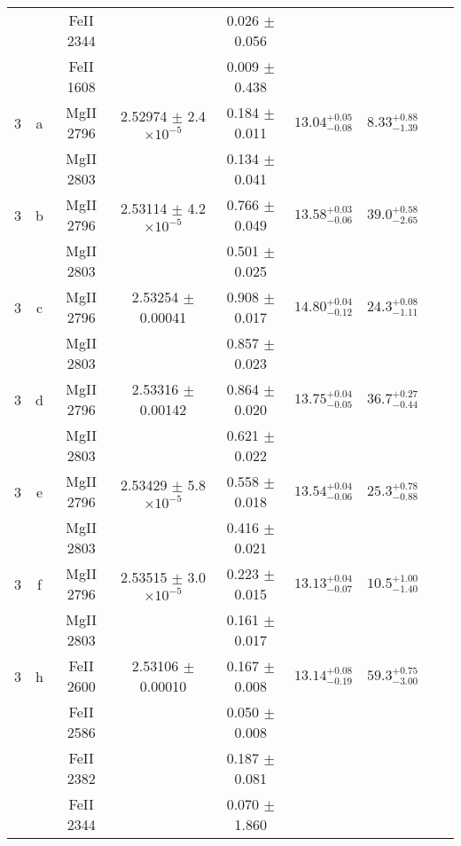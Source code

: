 \documentclass[12pt]{article}
\begin{document}
\begin{footnotesize}
\begin{longtable}{ c c c c c c c c c}
  &   & FeII     2344  &  &  0.026 $\pm$ 0.056   &   &     & 	 & \\ 
  &   & FeII     1608  &  &  0.009 $\pm$ 0.438   &   &     & 	 & \\ 
       3  & a  & MgII     2796  &  2.52974 $\pm$ 2.4 $\times 10^{-5}$   &  0.184 $\pm$ 0.011   & $13.04_{ - 0.08}^{ + 0.05}$  & $8.33_{ - 1.39}^{ + 0.88}$    & 	 & \\ 
  &   & MgII     2803  &  &  0.134 $\pm$ 0.041   &   &     & 	 & \\ 
       3  & b  & MgII     2796  &  2.53114 $\pm$ 4.2 $\times 10^{-5}$   &  0.766 $\pm$ 0.049   & $13.58_{ - 0.06}^{ + 0.03}$  & $39.0_{ - 2.65}^{ + 0.58}$    & 	 & \\ 
  &   & MgII     2803  &  &  0.501 $\pm$ 0.025   &   &     & 	 & \\ 
       3  & c  & MgII     2796  &  2.53254 $\pm$ 0.00041  &  0.908 $\pm$ 0.017   & $14.80_{ - 0.12}^{ + 0.04}$  & $24.3_{ - 1.11}^{ + 0.08}$    & 	 & \\ 
  &   & MgII     2803  &  &  0.857 $\pm$ 0.023   &   &     & 	 & \\ 
       3  & d  & MgII     2796  &  2.53316 $\pm$ 0.00142  &  0.864 $\pm$ 0.020   & $13.75_{ - 0.05}^{ + 0.04}$  & $36.7_{ - 0.44}^{ + 0.27}$    & 	 & \\ 
  &   & MgII     2803  &  &  0.621 $\pm$ 0.022   &   &     & 	 & \\ 
       3  & e  & MgII     2796  &  2.53429 $\pm$ 5.8 $\times 10^{-5}$   &  0.558 $\pm$ 0.018   & $13.54_{ - 0.06}^{ + 0.04}$  & $25.3_{ - 0.88}^{ + 0.78}$    & 	 & \\ 
  &   & MgII     2803  &  &  0.416 $\pm$ 0.021   &   &     & 	 & \\ 
       3  & f  & MgII     2796  &  2.53515 $\pm$ 3.0 $\times 10^{-5}$   &  0.223 $\pm$ 0.015   & $13.13_{ - 0.07}^{ + 0.04}$  & $10.5_{ - 1.40}^{ + 1.00}$    & 	 & \\ 
  &   & MgII     2803  &  &  0.161 $\pm$ 0.017   &   &     & 	 & \\ 
       3  & h  & FeII     2600  &  2.53106 $\pm$ 0.00010  &  0.167 $\pm$ 0.008   & $13.14_{ - 0.19}^{ + 0.08}$  & $59.3_{ - 3.00}^{ + 0.75}$    & 	 & \\ 
  &   & FeII     2586  &  &  0.050 $\pm$ 0.008   &   &     & 	 & \\ 
  &   & FeII     2382  &  &  0.187 $\pm$ 0.081   &   &     & 	 & \\ 
  &   & FeII     2344  &  &  0.070 $\pm$ 1.860   &   &     & 	 & \\ 

\end{longtable}
\end{footnotesize}
\end{document}
